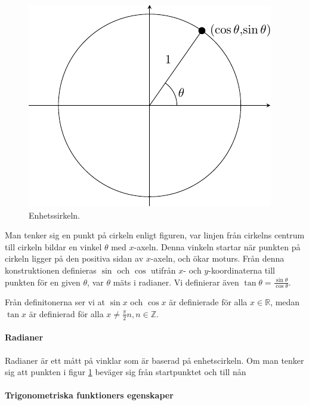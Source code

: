 \begin{figure}[!ht]
	\includegraphics[width=\linewidth]{./Images/unit_circle/unit_circle.pdf}
	\caption{Enhetssirkeln.}
	\label{fig:unit_circle}
\end{figure}

Man tenker sig en punkt på cirkeln enligt figuren, var linjen från cirkelns centrum till cirkeln bildar en vinkel $\theta$ med $x$-axeln. Denna vinkeln startar när punkten på cirkeln ligger på den positiva sidan av $x$-axeln, och ökar moturs. Från denna konstruktionen definieras $\sin$ och $\cos$ utifrån $x$- och $y$-koordinaterna till punkten för en given $\theta$, var $\theta$ mäts i radianer. Vi definierar även $\tan\theta=\frac{\sin\theta}{\cos\theta}$.

Från definitonerna ser vi at $\sin x$ och $\cos x$ är definierade för alla $x\in\mathbb{R}$, medan $\tan x$ är definierad för alla $x\neq \frac{\pi}{2}n, n\in\mathbb{Z}$.

\paragraph{Radianer}

Radianer är ett mått på vinklar som är baserad på enhetscirkeln. Om man tenker sig att punkten i figur \ref{fig:unit_circle} beväger sig från startpunktet och till nån 

\paragraph{Trigonometriska funktioners egenskaper}

